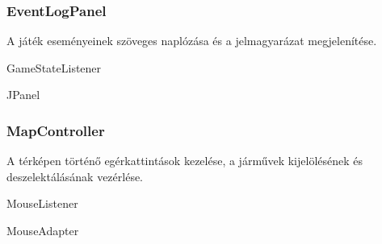 \subsubsection{EventLogPanel}
\begin{class-template-responsibility}
    A játék eseményeinek szöveges naplózása és a jelmagyarázat megjelenítése.
\end{class-template-responsibility}
\begin{class-template-interface}
    GameStateListener
\end{class-template-interface}
\begin{class-template-baseclass}
    JPanel
\end{class-template-baseclass}
\begin{class-template-attribute}
\end{class-template-attribute}
\begin{class-template-method}
\end{class-template-method}

\subsubsection{MapController}
\begin{class-template-responsibility}
    A térképen történő egérkattintások kezelése, a járművek kijelölésének és deszelektálásának vezérlése.
\end{class-template-responsibility}
\begin{class-template-interface}
    MouseListener
\end{class-template-interface}
\begin{class-template-baseclass}
    MouseAdapter
\end{class-template-baseclass}
\begin{class-template-attribute}
\end{class-template-attribute}
\begin{class-template-method}
\end{class-template-method}

